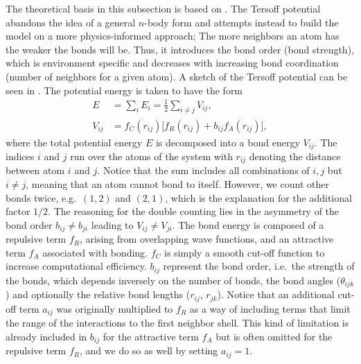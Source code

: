 

The theoretical basis in this subsection is based on \cite{docs_lammps_tersoff,PhysRevB.37.6991}. The Tersoff potential abandons the idea of a general $n$-body form and attempts
instead to build the model on a more physics-informed approach; The more
neighbors an atom has the weaker the bonds will be. Thus, it introduces the bond
order (bond strength), which is environment specific and decreases with increasing bond coordination (number of neighbors for a given atom). A sketch of the Tersoff potential can be seen in \cite{fig:bond_order}. The potential energy is taken to have the form
\begin{align*}
  E &= \sum_i E_i = \frac{1}{2}\sum_{i \ne j} V_{ij}, \\
  V_{ij} &= f_C(r_{ij}) \big[f_R(r_{ij}) + b_{ij}f_A(r_{ij})  \big],
\end{align*}
where the total potential energy $E$ is decomposed into a bond energy $V_{ij}$.
The indices $i$ and $j$ run over the atoms of the system with $r_{ij}$ denoting
the distance between atom $i$ and $j$. Notice that the sum includes all
combinations of $i,j$ but $i\ne j$, meaning that an atom cannot bond to itself. However, we count other bonds twice, e.g.\ $(1,2)$ and $(2,1)$, which is the
explanation for the additional factor $1/2$. The reasoning for the double counting lies in the asymmetry of the bond order $b_{ij}\ne b_{ji}$ leading to $V_{ij}\ne V_{ji}$.
The bond energy is composed of a repulsive term $f_R$, arising from overlapping
wave functions, and an attractive term $f_A$ associated with bonding. $f_C$ is
simply a smooth cut-off function to increase computational efficiency. $b_{ij}$
represent the bond order, i.e.\ the strength of the bonds, which depends
inversely on the number of bonds, the bond angles ($\theta_{ijk}$) and
optionally the relative bond lengths ($r_{ij}$, $r_{jk}$). Notice that an
additional cut-off term $a_{ij}$ was originally multiplied to $f_R$ as a way of
including terms that limit the range of the interactions to the first neighbor
shell. This kind of limitation is already included in $b_{ij}$ for the
attractive term $f_A$ but is often omitted for the repulsive term $f_R$, and we
do so as well by setting $a_{ij} = 1$. \\
